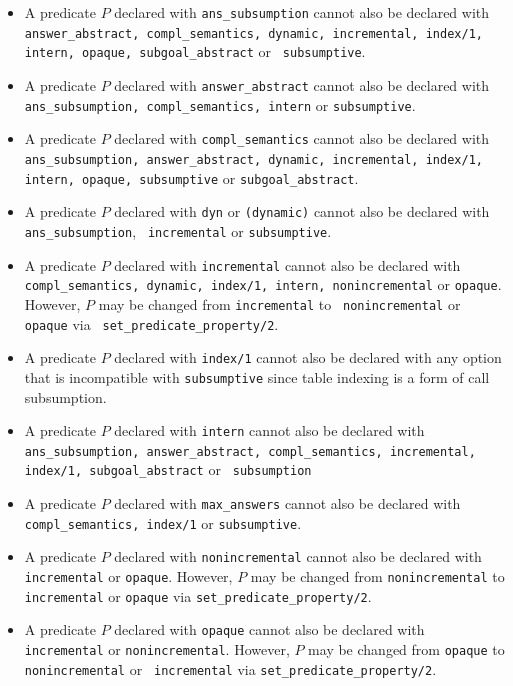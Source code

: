 \begin{itemize}
\item A predicate $P$ declared with {\tt ans\_subsumption} cannot also
  be declared with {\tt answer\_abstract, compl\_semantics, dynamic,
    incremental, index/1, intern, opaque, subgoal\_abstract} or {\tt
    subsumptive}.
%
\item A predicate $P$ declared with {\tt answer\_abstract} cannot also
  be declared with {\tt ans\_subsumption, compl\_semantics, intern} or
  {\tt subsumptive}.
%
\item A predicate $P$ declared with {\tt compl\_semantics} cannot also
  be declared with {\tt ans\_subsumption, answer\_abstract, dynamic,
    incremental, index/1, intern, opaque, subsumptive} or {\tt subgoal\_abstract}.
%
\item A predicate $P$ declared with {\tt dyn} or {\tt (dynamic)}
  cannot also be declared with {\tt ans\_subsumption}, {\tt
    incremental} or {\tt subsumptive}.
%
\item A predicate $P$ declared with {\tt incremental} cannot also be
  declared with {\tt compl\_semantics, dynamic, index/1, intern,
    nonincremental} or {\tt opaque}.
  However, $P$ may be changed from {\tt incremental} to {\tt
    nonincremental} or {\tt opaque} via {\tt
    set\_predicate\_property/2}.
%
\item A predicate $P$ declared with {\tt index/1} cannot also be
  declared with any option that is incompatible with {\tt subsumptive}
  since table indexing is a form of call subsumption.
%
\item A predicate $P$ declared with {\tt intern} cannot also be
  declared with {\tt ans\_subsumption, answer\_abstract,
    compl\_semantics, incremental, index/1, subgoal\_abstract} or {\tt
    subsumption}
%
\item A predicate $P$ declared with {\tt max\_answers} cannot also be
  declared with {\tt compl\_semantics, index/1} or {\tt subsumptive}.
%
\item A predicate $P$ declared with {\tt nonincremental} cannot also
  be declared with {\tt incremental} or {\tt opaque}.  However, $P$
  may be changed from {\tt nonincremental} to {\tt incremental} or
  {\tt opaque} via {\tt set\_predicate\_property/2}.
%
\item A predicate $P$ declared with {\tt opaque} cannot also be
  declared with {\tt incremental} or {\tt nonincremental}.  However,
  $P$ may be changed from {\tt opaque} to {\tt nonincremental} or {\tt
    incremental} via {\tt set\_predicate\_property/2}.

\end{itemize}
